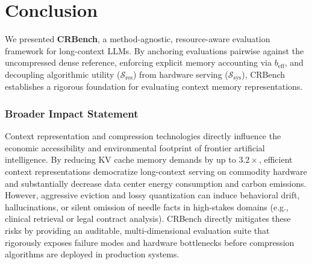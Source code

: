 \documentclass[10pt]{article}
\theoremstyle{definition}
\begin{document}
\section{Conclusion}
\label{sec:conclusion}
We presented \textbf{CRBench}, a method-agnostic, resource-aware evaluation framework for long-context LLMs. By anchoring evaluations pairwise against the uncompressed dense reference, enforcing explicit memory accounting via $b_{\text{eff}}$, and decoupling algorithmic utility ($\mathcal{S}_{\text{res}}$) from hardware serving ($\mathcal{S}_{\text{sys}}$), CRBench establishes a rigorous foundation for evaluating context memory representations.

\subsubsection*{Broader Impact Statement}
\label{sec:broader_impact}
Context representation and compression technologies directly influence the economic accessibility and environmental footprint of frontier artificial intelligence. By reducing KV cache memory demands by up to $3.2\times$, efficient context representations democratize long-context serving on commodity hardware and substantially decrease data center energy consumption and carbon emissions. However, aggressive eviction and lossy quantization can induce behavioral drift, hallucinations, or silent omission of needle facts in high-stakes domains (e.g., clinical retrieval or legal contract analysis). CRBench directly mitigates these risks by providing an auditable, multi-dimensional evaluation suite that rigorously exposes failure modes and hardware bottlenecks before compression algorithms are deployed in production systems.
\end{document}
